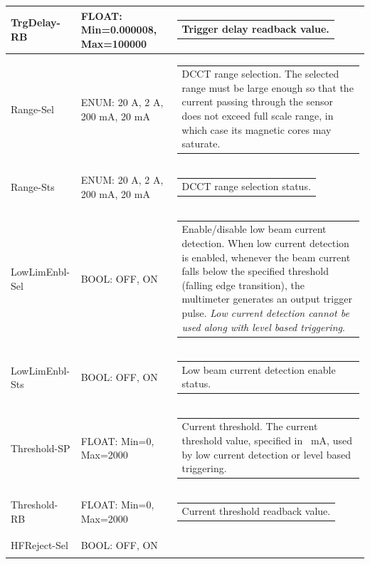 \documentclass[openany]{article}
\begin{document}
\begin{longtable}{| m{3.0cm} m{4.5cm} m{7.0cm} |}
		TrgDelay-RB & FLOAT: Min=0.000008, Max=100000 & \begin{tabular}{@{}m{6cm}@{}}
	    					Trigger delay readback value.
						\end{tabular} \\ \hline
		Range-Sel & ENUM: 20 A, 2 A, 200 mA, 20 mA & \begin{tabular}{@{}m{6cm}@{}}
	    					DCCT range selection. The selected range must be large enough so that the current passing through the sensor does not exceed full scale range, in which case its magnetic cores may saturate.
						\end{tabular} \\ \hline
		Range-Sts & ENUM: 20 A, 2 A, 200 mA, 20 mA & \begin{tabular}{@{}m{6cm}@{}}
	    					DCCT range selection status.
						\end{tabular} \\ \hline
		LowLimEnbl-Sel & BOOL: OFF, ON & \begin{tabular}{@{}m{6cm}@{}}
	    					Enable/disable low beam current detection. When low current detection is enabled, whenever the beam current falls below the specified threshold (falling edge transition), the multimeter generates an output trigger pulse. \emph{Low current detection cannot be used along with level based triggering}.
						\end{tabular} \\ \hline
		LowLimEnbl-Sts & BOOL: OFF, ON & \begin{tabular}{@{}m{6cm}@{}}
	    					Low beam current detection enable status.
						\end{tabular} \\ \hline
		Threshold-SP & FLOAT: Min=0, Max=2000 & \begin{tabular}{@{}m{6cm}@{}}
	    					Current threshold. The current threshold value, specified in \SI{}{\milli\ampere}, used by low current detection or level based triggering.
						\end{tabular} \\ \hline
		Threshold-RB & FLOAT: Min=0, Max=2000 & \begin{tabular}{@{}m{6cm}@{}}
	    					Current threshold readback value.
						\end{tabular} \\ \hline
		HFReject-Sel & BOOL: OFF, ON & \begin{tabular}{@{}m{6cm}@{}}

\end{tabular}
\end{longtable}
\end{document}
